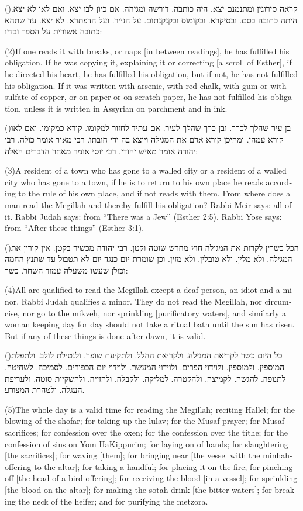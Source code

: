 \documentclass[12pt, openany]{book}
\newcommand{\sethebfont}{
\fontsize{10.5pt}{13.1pt} \selectfont
}
\newcommand{\hebeng}[2]{
	{\sethebfont #1\\}
	
	\begin{english}
		#2
	\end{english}
	\clearpage
}
\newcommand{\vsnum}[1]{(\hebrewnumeral{#1})\space}
\newcommand{\vsnumeng}[1]{(#1)\space}
\begin{document}
\hebeng{\vsnum{2}קראה סירוגין ומתנמנם יצא. היה כותבה. דורשה ומגיהה. אם כיון לבו יצא. ואם לאו לא יצא. היתה כתובה בסם. ובסיקרא. ובקומוס ובקנקנתום. על הנייר. ועל הדפתרא. לא יצא. עד שתהא כתובה אשורית על הספר ובדיו: }{\vsnumeng{2}If one reads it with breaks, or naps {[in between readings]}, he has fulfilled his obligation. If he was copying it, explaining it or correcting {[a scroll of Esther]}, if he directed his heart, he has fulfilled his obligation, but if not, he has not fulfilled his obligation. If it was written with arsenic, with red chalk, with gum or with sulfate of copper, or on paper or on scratch paper, he has not fulfilled his obligation, unless it is written in Assyrian on parchment and in ink.}%

\hebeng{\vsnum{3}בן עיר שהלך לכרך. ובן כרך שהלך לעיר. אם עתיד לחזור למקומו. קורא כמקומו. ואם לאו קורא עמהן. ומהיכן קורא אדם את המגילה ויוצא בה ידי חובתו. רבי מאיר אומר כולה. רבי יהודה אומר מאיש יהודי. רבי יוסי אומר מאחר הדברים האלה: }{\vsnumeng{3}A resident of a town who has gone to a walled city or a resident of a walled city who has gone to a town, if he is to return to his own place he reads according to the rule of his own place, and if not reads with them. From where does a man read the Megillah and thereby fulfill his obligation? Rabbi Meir says: all of it. Rabbi Judah says: from “There was a Jew” (Esther 2:5). Rabbi Yose says: from “After these things” (Esther 3:1).}%

\hebeng{\vsnum{4}הכל כשרין לקרות את המגילה חוץ מחרש שוטה וקטן. רבי יהודה מכשיר בקטן. אין קורין את המגילה. ולא מלין. ולא טובלין. ולא מזין. וכן שומרת יום כנגד יום לא תטבול עד שתנץ החמה וכולן שעשו משעלה עמוד השחר. כשר: }{\vsnumeng{4}All are qualified to read the Megillah except a deaf person, an idiot and a minor. Rabbi Judah qualifies a minor. They do not read the Megillah, nor circumcise, nor go to the mikveh, nor sprinkling {[purificatory waters]}, and similarly a woman keeping day for day should not take a ritual bath until the sun has risen. But if any of these things is done after dawn, it is valid.}%

\hebeng{\vsnum{5}כל היום כשר לקריאת המגילה. ולקריאת ההלל. ולתקיעת שופר. ולנטילת לולב. ולתפלת המוספין. ולמוספין. ולוידוי הפרים. ולוידוי המעשר. ולוידוי יום הכפורים. לסמיכה. לשחיטה. לתנופה. להגשה. לקמיצה. ולהקטרה. למליקה. ולקבלה. ולהזייה. ולהשקיית סוטה. ולעריפת העגלה. ולטהרת המצורע. }{\vsnumeng{5}The whole day is a valid time for reading the Megillah; reciting Hallel; for the blowing of the shofar; for taking up the lulav; for the Musaf prayer; for Musaf sacrifices; for confession over the oxen; for the confession over the tithe; for the confession of sins on Yom HaKippurim; for laying on of hands; for slaughtering {[the sacrifices]}; for waving {[them]}; for bringing near {[the vessel with the minhah-offering to the altar]}; for taking a handful; for placing it on the fire; for pinching off {[the head of a bird-offering]}; for receiving the blood {[in a vessel]}; for sprinkling {[the blood on the altar]}; for making the sotah drink {[the bitter waters]}; for breaking the neck of the heifer; and for purifying the metzora.}%
\end{document}
